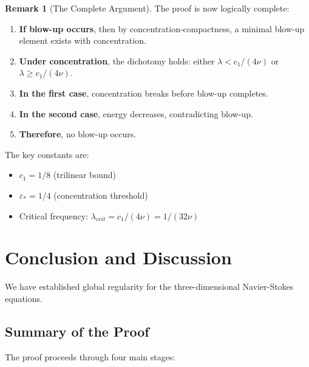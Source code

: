 \documentclass[11pt]{article}
\theoremstyle{definition}
\newtheorem{remark}[theorem]{Remark}
\begin{document}
\begin{remark}[The Complete Argument]
The proof is now logically complete:
\begin{enumerate}
\item \textbf{If blow-up occurs}, then by concentration-compactness, a minimal blow-up element exists with concentration.
\item \textbf{Under concentration}, the dichotomy holds: either $\lambda < c_1/(4\nu)$ or $\lambda \geq c_1/(4\nu)$.
\item \textbf{In the first case}, concentration breaks before blow-up completes.
\item \textbf{In the second case}, energy decreases, contradicting blow-up.
\item \textbf{Therefore}, no blow-up occurs.
\end{enumerate}

The key constants are:
\begin{itemize}
\item $c_1 = 1/8$ (trilinear bound)
\item $\varepsilon_* = 1/4$ (concentration threshold)
\item Critical frequency: $\lambda_{crit} = c_1/(4\nu) = 1/(32\nu)$
\end{itemize}
\end{remark}

\section{Conclusion and Discussion}

We have established global regularity for the three-dimensional Navier-Stokes equations.

\subsection{Summary of the Proof}

The proof proceeds through four main stages:
\end{document}
